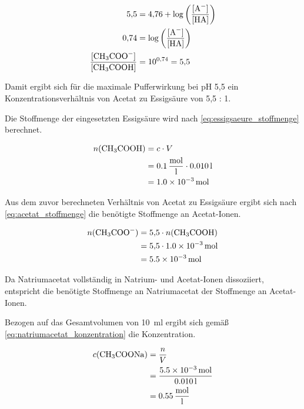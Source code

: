 \begin{equation}
    \begin{aligned}
        5{,}5
         & = 4{,}76 + \log\left(\frac{[\ce{A^-}]}{[\ce{HA}]}\right) \\
        0{,}74
         & = \log\left(\frac{[\ce{A^-}]}{[\ce{HA}]}\right)          \\
        \frac{[\ce{CH3COO^-}]}{[\ce{CH3COOH}]}
         & = 10^{0{,}74} = 5{,}5
    \end{aligned}
\end{equation}

Damit ergibt sich für die maximale Pufferwirkung bei pH 5{,}5 ein Konzentrationsverhältnis von Acetat zu Essigsäure von 5{,}5 : 1.

Die Stoffmenge der eingesetzten Essigsäure wird nach \eqref{eq:essigsaeure_stoffmenge} berechnet.

\begin{equation}
    \label{eq:essigsaeure_stoffmenge}
    \begin{aligned}
        n(\ce{CH3COOH})
         & = c \cdot V                                     \\
         & = \SI{0,1}{\frac{\mole}{l}} \cdot \SI{0,010}{l} \\
         & = \SI{1,0e-3}{\mole}
    \end{aligned}
\end{equation}

Aus dem zuvor berechneten Verhältnis von Acetat zu Essigsäure ergibt sich nach \eqref{eq:acetat_stoffmenge} die benötigte Stoffmenge an Acetat-Ionen.

\begin{equation}
    \label{eq:acetat_stoffmenge}
    \begin{aligned}
        n(\ce{CH3COO^-})
         & = 5{,}5 \cdot n(\ce{CH3COOH})    \\
         & = 5{,}5 \cdot \SI{1,0e-3}{\mole} \\
         & = \SI{5,5e-3}{\mole}
    \end{aligned}
\end{equation}

Da Natriumacetat vollständig in Natrium- und Acetat-Ionen dissoziiert, entspricht die benötigte Stoffmenge an Natriumacetat der Stoffmenge an Acetat-Ionen.

Bezogen auf das Gesamtvolumen von \SI{10}{ml} ergibt sich gemäß \eqref{eq:natriumacetat_konzentration} die Konzentration.

\begin{equation}
    \label{eq:natriumacetat_konzentration}
    \begin{aligned}
        c(\ce{CH3COONa})
         & = \frac{n}{V}                              \\
         & = \frac{\SI{5,5e-3}{\mole}}{\SI{0,010}{l}} \\
         & = \SI{0,55}{\frac{\mole}{l}}
    \end{aligned}
\end{equation}

